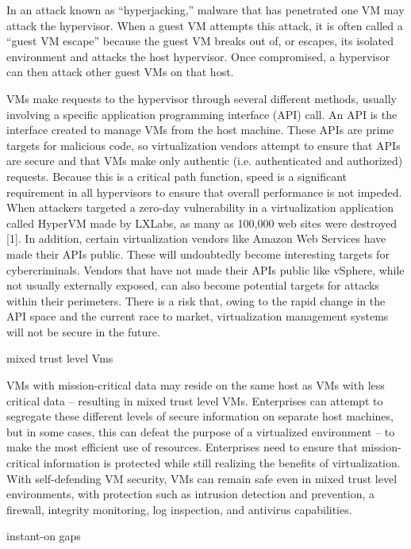 In an attack known as “hyperjacking,” malware that has penetrated one VM may attack the hypervisor. When a guest VM attempts this attack, it is often called a “guest VM escape” because the guest VM breaks out of, or escapes, its isolated environment and attacks the host hypervisor. Once compromised, a hypervisor can then attack other guest VMs on that host.

VMs make requests to the hypervisor through several different methods, usually involving a specific application programming interface (API) call. An API is the interface created to manage VMs from the host machine. These APIs are prime targets for malicious code, so virtualization vendors attempt to ensure that APIs are secure and that VMs make only authentic (i.e. authenticated and authorized) requests. Because this is a critical path function, speed is a significant requirement in all hypervisors to ensure that overall performance is not impeded.
When attackers targeted a zero-day vulnerability in a virtualization application called HyperVM made by LXLabs, as many as 100,000 web sites were destroyed [1]. In addition, certain virtualization vendors like Amazon Web Services have made their APIs public. These will undoubtedly become interesting targets for cybercriminals. Vendors that have not made their APIs public like vSphere, while not usually externally exposed, can also become potential targets for attacks within their perimeters. There is a risk that, owing to the rapid change in the API space and the current race to market, virtualization management systems will not be secure in the future.

mixed trust level Vms

VMs with mission-critical data may reside on the same host as VMs with less critical data – resulting in mixed trust level VMs. Enterprises can attempt to segregate these different levels of secure information on separate host machines, but in some cases, this can defeat the purpose of a virtualized environment – to make the most efficient use of resources. Enterprises need to ensure that mission-critical information is protected while still realizing the benefits of virtualization. With self-defending VM security, VMs can remain safe even in mixed trust level environments, with protection such as intrusion detection and prevention, a firewall, integrity monitoring, log inspection, and antivirus capabilities.

instant-on gaps

